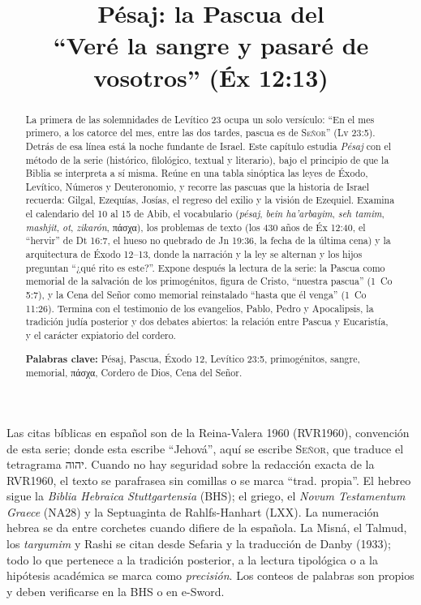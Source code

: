 \documentclass[11pt,letterpaper]{article}
\title{\color{tierraroja}\bfseries Pésaj: la Pascua del \SENOR\\[4pt]\large\color{sepia}\mdseries ``Veré la sangre y pasaré de vosotros'' (Éx 12:13)}
\author{}\date{}
\newcommand{\heb}[1]{\mbox{\foreignlanguage{hebrew}{#1}}}
\newcommand{\grc}[1]{\foreignlanguage{ancientgreek}{#1}}
\newcommand{\SENOR}{\textsc{Señor}}
\begin{document}
\maketitle\thispagestyle{empty}

\begin{abstract}\noindent
La primera de las solemnidades de Levítico 23 ocupa un solo versículo: ``En el mes primero, a los catorce del mes, entre las dos tardes, pascua es de \SENOR'' (Lv 23:5). Detrás de esa línea está la noche fundante de Israel. Este capítulo estudia \emph{Pésaj} con el método de la serie (histórico, filológico, textual y literario), bajo el principio de que la Biblia se interpreta a sí misma. Reúne en una tabla sinóptica las leyes de Éxodo, Levítico, Números y Deuteronomio, y recorre las pascuas que la historia de Israel recuerda: Gilgal, Ezequías, Josías, el regreso del exilio y la visión de Ezequiel. Examina el calendario del 10 al 15 de Abib, el vocabulario (\emph{pésaj}, \emph{bein ha'arbayim}, \emph{seh tamim}, \emph{mashjit}, \emph{ot}, \emph{zikarón}, \grc{πάσχα}), los problemas de texto (los 430 años de Éx 12:40, el ``hervir'' de Dt 16:7, el hueso no quebrado de Jn 19:36, la fecha de la última cena) y la arquitectura de Éxodo 12--13, donde la narración y la ley se alternan y los hijos preguntan ``¿qué rito es este?''. Expone después la lectura de la serie: la Pascua como memorial de la salvación de los primogénitos, figura de Cristo, ``nuestra pascua'' (1~Co 5:7), y la Cena del Señor como memorial reinstalado ``hasta que él venga'' (1~Co 11:26). Termina con el testimonio de los evangelios, Pablo, Pedro y Apocalipsis, la tradición judía posterior y dos debates abiertos: la relación entre Pascua y Eucaristía, y el carácter expiatorio del cordero.
\par\smallskip\noindent\textbf{Palabras clave:} Pésaj, Pascua, Éxodo 12, Levítico 23:5, primogénitos, sangre, memorial, \grc{πάσχα}, Cordero de Dios, Cena del Señor.\end{abstract}

\begin{nota}
Las citas bíblicas en español son de la Reina-Valera 1960 (RVR1960), convención de esta serie; donde esta escribe ``Jehová'', aquí se escribe \SENOR, que traduce el tetragrama \heb{יהוה}. Cuando no hay seguridad sobre la redacción exacta de la RVR1960, el texto se parafrasea sin comillas o se marca ``trad. propia''. El hebreo sigue la \emph{Biblia Hebraica Stuttgartensia} (BHS); el griego, el \emph{Novum Testamentum Graece} (NA28) y la Septuaginta de Rahlfs-Hanhart (LXX). La numeración hebrea se da entre corchetes cuando difiere de la española. La Misná, el Talmud, los \emph{targumim} y Rashi se citan desde Sefaria y la traducción de Danby (1933); todo lo que pertenece a la tradición posterior, a la lectura tipológica o a la hipótesis académica se marca como \emph{precisión}. Los conteos de palabras son propios y deben verificarse en la BHS o en e-Sword.
\end{nota}
\end{document}
